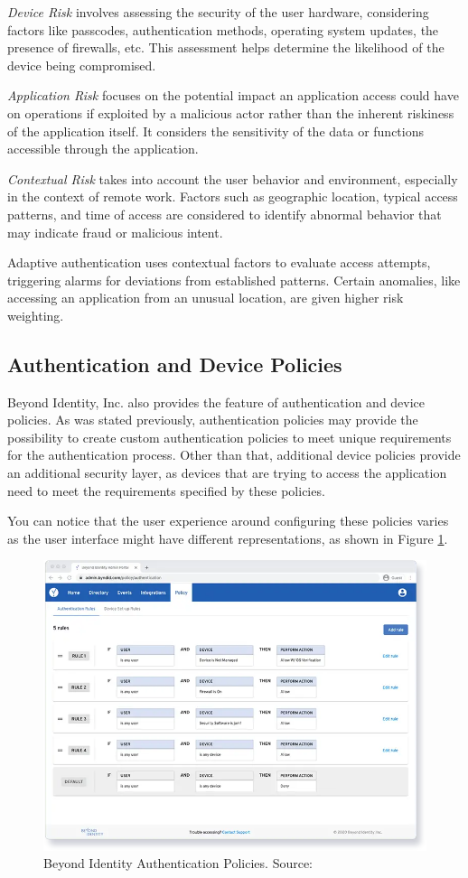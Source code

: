 \textit{Device Risk} involves assessing the security of the user hardware, considering factors like passcodes, authentication methods, operating system updates, the presence of firewalls, etc.
This assessment helps determine the likelihood of the device being compromised.

\textit{Application Risk} focuses on the potential impact an application access could have on operations if exploited by a malicious actor rather than the inherent riskiness of the application itself.
It considers the sensitivity of the data or functions accessible through the application.

\textit{Contextual Risk} takes into account the user behavior and environment, especially in the context of remote work.
Factors such as geographic location, typical access patterns, and time of access are considered to identify abnormal behavior that may indicate fraud or malicious intent.

Adaptive authentication uses contextual factors to evaluate access attempts, triggering alarms for deviations from established patterns.
Certain anomalies, like accessing an application from an unusual location, are given higher risk weighting.

\newpage
\subsection*{Authentication and Device Policies}
Beyond Identity, Inc. also provides the feature of authentication and device policies.
As was stated previously, authentication policies may provide the possibility to create custom authentication policies to meet unique requirements for the authentication process.
Other than that, additional device policies provide an additional security layer, as devices that are trying to access the application need to meet the requirements specified by these policies.

You can notice that the user experience around configuring these policies varies as the user interface might have different representations, as shown in Figure \ref{fig:beyond-identity-auth-policy}. \cite{existing-beyond-identity}

\begin{figure}[htbp]
  \centering
  \includegraphics[width=1\textwidth]{img/beyond-auth-policy.png}
  \caption[Beyond Identity Authentication Policies]{Beyond Identity Authentication Policies. Source: \cite{existing-beyond-identity}}
  \label{fig:beyond-identity-auth-policy}
\end{figure}

\newpage